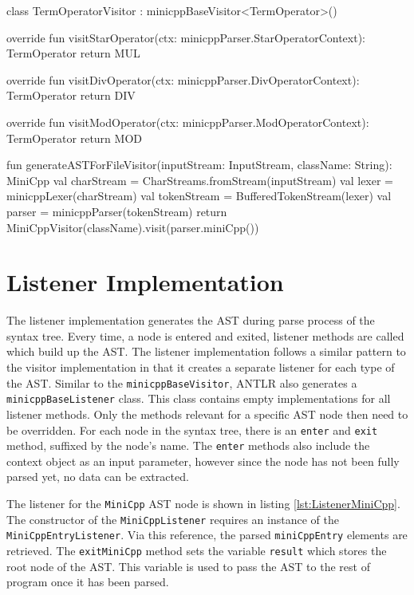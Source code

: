 \begin{KotlinCode}[float,numbers=none,caption=Implementation of the \texttt{TermOperatorVisitor} class., label=lst:VisitorTermOpVis]
class TermOperatorVisitor : minicppBaseVisitor<TermOperator>() {
    override fun visitStarOperator(ctx: minicppParser.StarOperatorContext): TermOperator {
        return MUL
    }

    override fun visitDivOperator(ctx: minicppParser.DivOperatorContext): TermOperator {
        return DIV
    }

    override fun visitModOperator(ctx: minicppParser.ModOperatorContext): TermOperator {
        return MOD
    }
}
\end{KotlinCode}

\begin{KotlinCode}[float,numbers=none,caption=Code for the generation of the AST using the visitor-pattern., label=lst:VisitorExec]
fun generateASTForFileVisitor(inputStream: InputStream, className: String): MiniCpp{
    val charStream = CharStreams.fromStream(inputStream)
    val lexer = minicppLexer(charStream)
    val tokenStream = BufferedTokenStream(lexer)
    val parser = minicppParser(tokenStream)
    return MiniCppVisitor(className).visit(parser.miniCpp())
}
\end{KotlinCode}

\section{Listener Implementation}

The listener implementation generates the AST during parse process of the syntax tree. Every time, a node is entered and exited, listener methods are called which build up the AST. The listener implementation follows a similar pattern to the visitor implementation in that it creates a separate listener for each type of the AST. Similar to the \verb|minicppBaseVisitor|, ANTLR also generates a \verb|minicppBaseListener| class. This class contains empty implementations for all listener methods. Only the methods relevant for a specific AST node then need to be overridden. For each node in the syntax tree, there is an \verb|enter| and \verb|exit| method, suffixed by the node's name. The \verb|enter| methods also include the context object as an input parameter, however since the node has not been fully parsed yet, no data can be extracted. 

The listener for the \verb|MiniCpp| AST node is shown in listing \ref{lst:ListenerMiniCpp}. The constructor of the \verb|MiniCppListener| requires an instance of the \verb|MiniCppEntryListener|. Via this reference, the parsed \verb|miniCppEntry| elements are retrieved. The \verb|exitMiniCpp| method sets the variable \verb|result| which stores the root node of the AST. This variable is used to pass the AST to the rest of program once it has been parsed.


